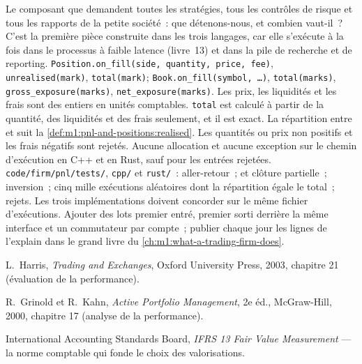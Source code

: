 \begin{build}
 Le composant que demandent toutes les stratégies, tous les contrôles de risque et tous les rapports de
la petite société~: que détenons-nous, et combien vaut-il~? C'est la première
pièce construite dans les trois langages, car elle s'exécute à la fois dans le
processus à faible latence (livre~13) et dans la
pile de recherche et de reporting.
 \texttt{Position.on\_fill(side, quantity, price, fee)},
\texttt{unrealised(mark)}, \texttt{total(mark)}; \texttt{Book.on\_fill(symbol,
\dots)}, \texttt{total(marks)}, \texttt{gross\_exposure(marks)},
\texttt{net\_exposure(marks)}. Les prix, les liquidités et les frais sont des entiers en unités
comptables.
 \texttt{total} est calculé à partir de la quantité, des liquidités et des frais seulement,
et il est exact. La répartition entre  et  suit
la \cref{def:m1:pnl-and-positions:realised}. Les quantités ou prix non positifs
et les frais négatifs sont rejetés. Aucune allocation et aucune exception sur le
chemin d'exécution en C++ et en Rust, sauf pour les entrées rejetées.
 \texttt{code/firm/pnl/tests/}, \texttt{cpp/} et
\texttt{rust/}~: aller-retour~;  et clôture partielle~; inversion~; cinq
mille exécutions aléatoires dont la répartition égale le total~; rejets. Les trois
implémentations doivent concorder sur le même fichier d'exécutions.
 Ajouter des lots premier entré, premier sorti derrière la même interface et un
commutateur par compte~; publier chaque jour les lignes de l'explain dans le grand livre du
\cref{ch:m1:what-a-trading-firm-does}.
\end{build}

\begin{omsources}
\item L.~Harris, \emph{Trading and Exchanges}, Oxford University Press, 2003,
chapitre 21 (évaluation de la performance).
\item R.~Grinold et R.~Kahn, \emph{Active Portfolio Management}, 2e éd.,
McGraw-Hill, 2000, chapitre 17 (analyse de la performance).
\item International Accounting Standards Board, \emph{IFRS 13 Fair Value
Measurement} --- la norme comptable qui fonde le choix des valorisations.
\end{omsources}

